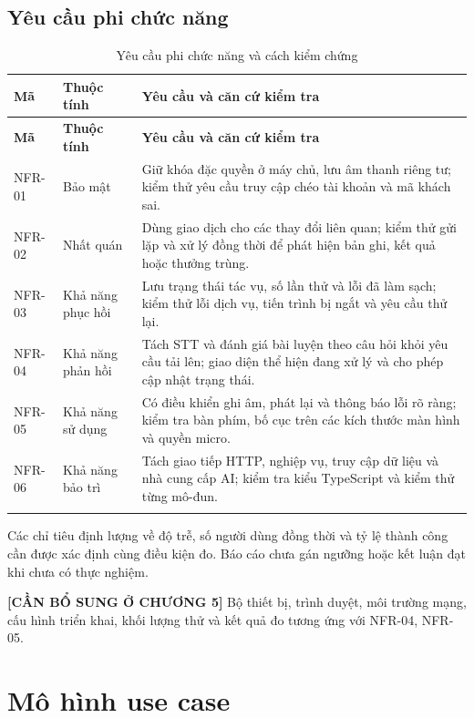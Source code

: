 \documentclass[12pt,a4paper,oneside]{report}
\begin{document}
\subsection{Yêu cầu phi chức năng}

\begin{longtable}{@{}p{1.5cm}p{3.3cm}p{9.5cm}@{}}
    \toprule
    \textbf{Mã} & \textbf{Thuộc tính} & \textbf{Yêu cầu và căn cứ kiểm tra} \\
    \midrule
    \endfirsthead
    \toprule
    \textbf{Mã} & \textbf{Thuộc tính} & \textbf{Yêu cầu và căn cứ kiểm tra} \\
    \midrule
    \endhead
    NFR-01 & Bảo mật & Giữ khóa đặc quyền ở máy chủ, lưu âm thanh riêng tư; kiểm thử yêu cầu truy cập chéo tài khoản và mã khách sai. \\
    NFR-02 & Nhất quán & Dùng giao dịch cho các thay đổi liên quan; kiểm thử gửi lặp và xử lý đồng thời để phát hiện bản ghi, kết quả hoặc thưởng trùng. \\
    NFR-03 & Khả năng phục hồi & Lưu trạng thái tác vụ, số lần thử và lỗi đã làm sạch; kiểm thử lỗi dịch vụ, tiến trình bị ngắt và yêu cầu thử lại. \\
    NFR-04 & Khả năng phản hồi & Tách STT và đánh giá bài luyện theo câu hỏi khỏi yêu cầu tải lên; giao diện thể hiện đang xử lý và cho phép cập nhật trạng thái. \\
    NFR-05 & Khả năng sử dụng & Có điều khiển ghi âm, phát lại và thông báo lỗi rõ ràng; kiểm tra bàn phím, bố cục trên các kích thước màn hình và quyền micro. \\
    NFR-06 & Khả năng bảo trì & Tách giao tiếp HTTP, nghiệp vụ, truy cập dữ liệu và nhà cung cấp AI; kiểm tra kiểu TypeScript và kiểm thử từng mô-đun. \\
    \bottomrule
    \caption{Yêu cầu phi chức năng và cách kiểm chứng}\label{tab:yeu-cau-phi-chuc-nang}\\
\end{longtable}

Các chỉ tiêu định lượng về độ trễ, số người dùng đồng thời và tỷ lệ thành công cần được xác định cùng điều kiện đo. Báo cáo chưa gán ngưỡng hoặc kết luận đạt khi chưa có thực nghiệm.

\noindent\textbf{[CẦN BỔ SUNG Ở CHƯƠNG 5]} Bộ thiết bị, trình duyệt, môi trường mạng, cấu hình triển khai, khối lượng thử và kết quả đo tương ứng với NFR-04, NFR-05.

\section{Mô hình use case}
\end{document}
